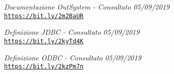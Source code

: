 \begin{thebibliography}{99}
	\bibitem{[25]} \label{bib25}
	\textit{Documentazione OutSystem - Consultato 05/09/2019}\\
	\texttt{\url{https://bit.ly/2m2BaUR}}
	
	\bibitem{[26]} \label{bib26}
	\textit{Definizione JDBC - Consultato 05/09/2019}\\
	\texttt{\url{https://bit.ly/2kyTd4K}}
	
	\bibitem{[27]} \label{bib27}
	\textit{Definizione ODBC - Consultato 05/09/2019}\\
	\texttt{\url{https://bit.ly/2kzPm7n}}
	
	
	
\end{thebibliography}



